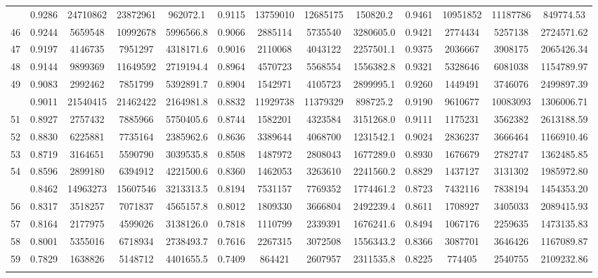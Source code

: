 \documentclass[
  12pt,
]{article}
\begin{document}
\begin{longtable}[t]{lcccccccccccc}
\addlinespace
45 & 0.9286 & 24710862 & 23872961 & 962072.1 & 0.9115 & 13759010 & 12685175 & 150820.2 & 0.9461 & 10951852 & 11187786 & 849774.53\\
46 & 0.9244 & 5659548 & 10992678 & 5996566.8 & 0.9066 & 2885114 & 5735540 & 3280605.0 & 0.9421 & 2774434 & 5257138 & 2724571.62\\
47 & 0.9197 & 4146735 & 7951297 & 4318171.6 & 0.9016 & 2110068 & 4043122 & 2257501.1 & 0.9375 & 2036667 & 3908175 & 2065426.34\\
48 & 0.9144 & 9899369 & 11649592 & 2719194.4 & 0.8964 & 4570723 & 5568554 & 1556382.8 & 0.9321 & 5328646 & 6081038 & 1154789.97\\
49 & 0.9083 & 2992462 & 7851799 & 5392891.7 & 0.8904 & 1542971 & 4105723 & 2899995.1 & 0.9260 & 1449491 & 3746076 & 2499897.39\\
\addlinespace
50 & 0.9011 & 21540415 & 21462422 & 2164981.8 & 0.8832 & 11929738 & 11379329 & 898725.2 & 0.9190 & 9610677 & 10083093 & 1306006.71\\
51 & 0.8927 & 2757432 & 7885966 & 5750405.6 & 0.8744 & 1582201 & 4323584 & 3151268.0 & 0.9111 & 1175231 & 3562382 & 2613188.59\\
52 & 0.8830 & 6225881 & 7735164 & 2385962.6 & 0.8636 & 3389644 & 4068700 & 1231542.1 & 0.9024 & 2836237 & 3666464 & 1166910.46\\
53 & 0.8719 & 3164651 & 5590790 & 3039535.8 & 0.8508 & 1487972 & 2808043 & 1677289.0 & 0.8930 & 1676679 & 2782747 & 1362485.85\\
54 & 0.8596 & 2899180 & 6394912 & 4221500.6 & 0.8360 & 1462053 & 3263610 & 2241560.2 & 0.8829 & 1437127 & 3131302 & 1985972.80\\
\addlinespace
55 & 0.8462 & 14963273 & 15607546 & 3213313.5 & 0.8194 & 7531157 & 7769352 & 1774461.2 & 0.8723 & 7432116 & 7838194 & 1454353.20\\
56 & 0.8317 & 3518257 & 7071837 & 4565157.8 & 0.8012 & 1809330 & 3666804 & 2492239.4 & 0.8611 & 1708927 & 3405033 & 2089415.93\\
57 & 0.8164 & 2177975 & 4599026 & 3138126.0 & 0.7818 & 1110799 & 2339391 & 1676241.6 & 0.8494 & 1067176 & 2259635 & 1473135.83\\
58 & 0.8001 & 5355016 & 6718934 & 2738493.7 & 0.7616 & 2267315 & 3072508 & 1556343.2 & 0.8366 & 3087701 & 3646426 & 1167089.87\\
59 & 0.7829 & 1638826 & 5148712 & 4401655.5 & 0.7409 & 864421 & 2607957 & 2311535.8 & 0.8225 & 774405 & 2540755 & 2109232.86\\
\addlinespace

\end{longtable}
\end{document}
